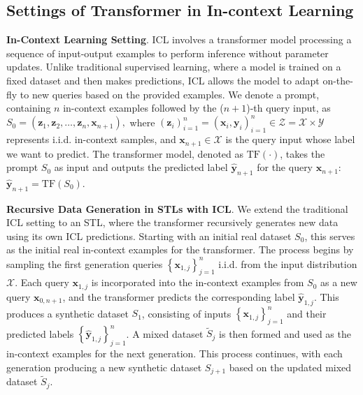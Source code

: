 \subsection{Settings of Transformer in In-context Learning}\label{subsection_tra1}

\textbf{In-Context Learning Setting}. ICL involves a transformer model processing a sequence of input-output examples to perform inference without parameter updates. Unlike traditional supervised learning, where a model is trained on a fixed dataset and then makes predictions, ICL allows the model to adapt on-the-fly to new queries based on the provided examples. We denote a prompt, containing $n$ in-context examples followed by the ($n+1$)-th query input, as
$
S_{0}=\left(\boldsymbol{z}_1, \boldsymbol{z}_2, \ldots, \boldsymbol{z}_{n}, \boldsymbol{x}_{n+1}\right),
$
where $\left(\boldsymbol{z}_i\right)_{i=1}^n=\left(\boldsymbol{x}_i, \boldsymbol{y}_i\right)_{i=1}^n \in \mathcal{Z}=\mathcal{X} \times \mathcal{Y}$ represents i.i.d. in-context samples, and $\boldsymbol{x}_{n+1} \in \mathcal{X}$ is the query input whose label we want to predict. The transformer model, denoted as $\mathrm{TF}(\cdot)$, takes the prompt $S_0$ as input and outputs the predicted label $\hat{\boldsymbol{y}}_{n+1}$ for the query $\boldsymbol{x}_{n+1}$: $\hat{\boldsymbol{y}}_{n+1}=\mathrm{TF}(S_0)$.

\textbf{Recursive Data Generation in STLs with ICL}. We extend the traditional ICL setting to an STL, where the transformer recursively generates new data using its own ICL predictions. Starting with an initial real dataset $S_0$, this serves as the initial real in-context examples for the transformer. The process begins by sampling the first generation queries $\left\{\boldsymbol{x}_{1, j}\right\}_{j=1}^n$ i.i.d. from the input distribution $\mathcal{X}$. Each query $\boldsymbol{x}_{1, j}$ is incorporated into the in-context examples from $S_0$ as a new query $\boldsymbol{x}_{0,n+1}$, and the transformer predicts the corresponding label $\hat{\boldsymbol{y}}_{1, j}$. This produces a synthetic dataset $S_1$, consisting of inputs $\left\{\boldsymbol{x}_{1, j}\right\}_{j=1}^n$ and their predicted labels $\left\{\hat{\boldsymbol{y}}_{1, j}\right\}_{j=1}^n$. A mixed dataset $\widetilde{S}_j$ is then formed and used as the in-context examples for the next generation. This process continues, with each generation producing a new synthetic dataset $S_{j+1}$ based on the updated mixed dataset $\widetilde{S}_j$.


